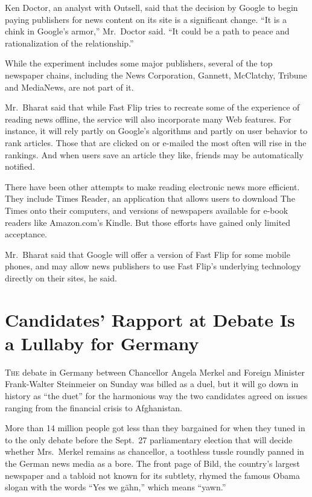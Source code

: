 ﻿\documentclass[12pt]{article}
\begin{document}
Ken Doctor, an analyst with Outsell, said that the decision by Google to begin paying publishers for
news content on its site is a significant change. ``It is a chink\cite{Chink} in Google's armor,''
Mr.~Doctor said. ``It could be a path to peace and rationalization of the relationship.''

While the experiment includes some major publishers, several of the top newspaper chains, including
the News Corporation, Gannett, McClatchy, Tribune and MediaNews, are not part of it.

Mr.~Bharat said that while Fast Flip tries to recreate some of the experience of reading news
offline, the service will also incorporate many Web features. For instance, it will rely partly on
Google's algorithms and partly on user behavior to rank articles. Those that are clicked on or
e-mailed the most often will rise in the rankings. And when users save an article they like, friends
may be automatically notified.

There have been other attempts to make reading electronic news more efficient. They include Times
Reader, an application that allows users to download The Times onto their computers, and versions of
newspapers available for e-book readers like Amazon.com's Kindle. But those efforts have gained only
limited acceptance.

Mr.~Bharat said that Google will offer a version of Fast Flip for some mobile phones, and may allow
news publishers to use Fast Flip's underlying technology directly on their sites, he said.

\section{Candidates' Rapport\cite{rapport} at Debate Is a Lullaby\cite{lullaby} for Germany}

\lettrine{T}{he} debate in Germany between Chancellor Angela Merkel and Foreign Minister
Frank-Walter Steinmeier on Sunday was billed as a duel, but it will go down in history as ``the
duet'' for the harmonious way the two candidates agreed on issues ranging from the financial crisis
to Afghanistan.

More than 14 million people got less than they bargained for when they tuned in to the only debate
before the Sept.~27 parliamentary election that will decide whether Mrs.~Merkel remains as
chancellor, a toothless tussle roundly panned in the German news media as a bore. The front page of
Bild, the country's largest newspaper and a tabloid\cite{tabloid} not known for its subtlety, rhymed
the famous Obama slogan with the words ``Yes we g\"ahn,'' which means ``yawn.''
\end{document}
